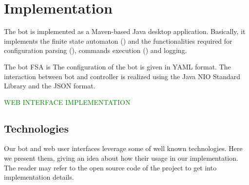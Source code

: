 \section{Implementation}
\label{sec:implementation}

The bot is implemented as a Maven-based Java desktop application.
Basically, it implements the finite state automaton () and the functionalities required for configuration parsing (), commands execution () and logging.

The bot FSA is
The configuration of the bot is given in YAML format.
The interaction between bot and controller is realized using the Java NIO Standard Library and the JSON format.

\textcolor{green}{WEB INTERFACE IMPLEMENTATION \lipsum[1]}

\subsection{Technologies}
\label{sec:technologies}

Our bot and web user interfaces leverage some of well known technologies. Here we present them, giving an idea about how their usage in our implementation. The reader may refer to the open source code of the project to get into implementation details.

